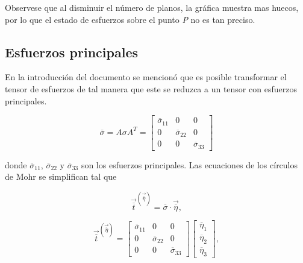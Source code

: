 \documentclass{article}
\begin{document}
    Observese que al disminuir el n\'{u}mero de planos, la gr\'{a}fica muestra mas huecos, por
    lo que el estado de esfuerzos sobre el punto \textit{P} no es tan preciso.

    \newpage

    \subsection{Esfuerzos principales}

    En la introducci\'{o}n del documento se mencion\'{o} que es posible transformar el
    tensor de esfuerzos de tal manera que este se reduzca a un tensor con esfuerzos principales.

    \begin{equation}
        \overline{\sigma} = A \sigma A^{T} = 
        \begin{bmatrix}
            \overline{\sigma}_{11} & 0 & 0\\
            0 & \overline{\sigma}_{22} & 0\\
            0 & 0 & \overline{\sigma}_{33}
        \end{bmatrix}
    \end{equation}

    donde $\overline{\sigma}_{11}$, $\overline{\sigma}_{22}$ y $\overline{\sigma}_{33}$ son los esfuerzos
    principales.
    Las ecuaciones de los c\'{i}rculos de Mohr se simplifican tal que

    \begin{equation}
        \vec{\overline{t}}^{(\vec{\overline{\eta}})} = \overline{\sigma} \cdot \vec{\overline{\eta}},
    \end{equation}

    \begin{equation}
        \vec{\overline{t}}^{(\vec{\overline{\eta}})} =
        \begin{bmatrix}
            \overline{\sigma}_{11} & 0 & 0\\
            0 & \overline{\sigma}_{22} & 0\\
            0 & 0 & \overline{\sigma}_{33}
        \end{bmatrix}
        \begin{bmatrix}
            \overline{\eta}_{1} \\
            \overline{\eta}_{2} \\
            \overline{\eta}_{3}
        \end{bmatrix},
    \end{equation}
\end{document}
